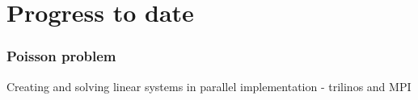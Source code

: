 \documentclass{beamer}
\begin{document}
\section[Progress]{Progress to date}

\begin{frame}[shrink=20]%
\frametitle{Poisson problem}
\scriptsize
\begin{minipage}[t][1\textheight]{1\textwidth}
\vspace{-20pt}
\begin{exampleblock}{Creating and solving linear systems in parallel implementation - trilinos and MPI}
\vspace{-20pt}
\begin{figure}
\label{fig:Poisson}
\centering
{}

\end{figure}
\end{exampleblock}
\end{minipage}
\end{frame}
\end{document}
